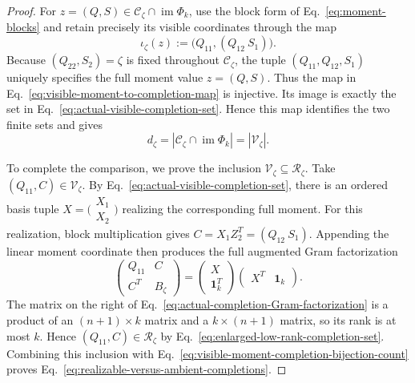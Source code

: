 \documentclass[11pt]{article}
\newcommand{\1}{\mathbf 1}
\theoremstyle{plain}
\theoremstyle{definition}
\theoremstyle{remark}
\begin{document}
\begin{proof}
For $z=(Q,S)\in\mathcal C_{\zeta}\cap\operatorname{im}\Phi_k$, use the
block form of Eq.~\eqref{eq:moment-blocks} and retain precisely its visible
coordinates through the map
\begin{equation}
 \iota_{\zeta}(z)
 :=\bigl(Q_{11},(Q_{12}\ S_1)\bigr).
 \label{eq:visible-moment-to-completion-map}
\end{equation}
Because $(Q_{22},S_2)=\zeta$ is fixed throughout
$\mathcal C_{\zeta}$, the tuple $(Q_{11},Q_{12},S_1)$ uniquely specifies the
full moment value
$z=(Q,S)$.  Thus the map in
Eq.~\eqref{eq:visible-moment-to-completion-map} is injective.  Its image is exactly the set in
Eq.~\eqref{eq:actual-visible-completion-set}.  Hence this map identifies
the two finite sets and gives
\begin{equation}
 d_{\zeta}
 =|\mathcal C_{\zeta}\cap\operatorname{im}\Phi_k|
 =|\mathcal V_{\zeta}|.
 \label{eq:visible-moment-completion-bijection-count}
\end{equation}

To complete the comparison, we prove the inclusion $\mathcal V_{\zeta}\subseteq\mathcal R_{\zeta}$.  Take
$(Q_{11},C)\in\mathcal V_{\zeta}$.  By
Eq.~\eqref{eq:actual-visible-completion-set}, there is an ordered basis tuple
$X=\bigl(\begin{smallmatrix}X_1\\X_2\end{smallmatrix}\bigr)$ realizing the
corresponding full moment.  For this realization, block multiplication gives
$C=X_1Z_2^T=(Q_{12}\ S_1)$.  Appending the linear moment coordinate then
produces the full augmented Gram factorization
\begin{equation}
 \begin{pmatrix}Q_{11}&C\\C^T&B_{\zeta}\end{pmatrix}
 =\begin{pmatrix}X\\\1_k^T\end{pmatrix}
  \begin{pmatrix}X^T&\1_k\end{pmatrix}.
 \label{eq:actual-completion-Gram-factorization}
\end{equation}
The matrix on the right of
Eq.~\eqref{eq:actual-completion-Gram-factorization} is a product of an
$(n+1)\times k$ matrix and a $k\times(n+1)$ matrix, so its rank is at most
$k$.  Hence $(Q_{11},C)\in\mathcal R_{\zeta}$ by
Eq.~\eqref{eq:enlarged-low-rank-completion-set}.  Combining this inclusion
with Eq.~\eqref{eq:visible-moment-completion-bijection-count} proves
Eq.~\eqref{eq:realizable-versus-ambient-completions}.
\end{proof}
\end{document}
